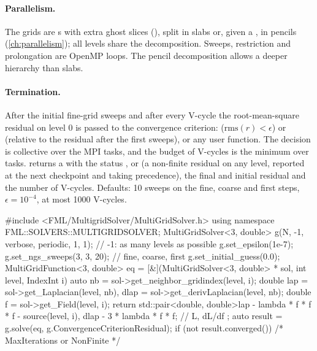 \paragraph*{Parallelism.} The grids are s with extra ghost slices (), split in
slabs or, given a , in pencils (\cref{ch:parallelism}); all levels share the decomposition. Sweeps,
restriction and prolongation are OpenMP loops. The pencil decomposition allows a deeper hierarchy than slabs.

\paragraph*{Termination.} After the initial fine-grid sweeps and after every V-cycle the root-mean-square residual on level 0
is passed to the convergence criterion:  ($\mathrm{rms}(r)<\epsilon$) or
 (relative to the residual after the first sweeps), or any user function. The decision is
collective over the MPI tasks, and the budget of V-cycles is the minimum over tasks.  returns a 
with the status ,  or  (a non-finite residual on any level, reported at
the next checkpoint and taking precedence), the final and initial residual and the number of V-cycles. Defaults: 10 sweeps
on the fine, coarse and first steps, $\epsilon=10^{-4}$, at most 1000 V-cycles.

\begin{cppcode}
#include <FML/MultigridSolver/MultiGridSolver.h>
using namespace FML::SOLVERS::MULTIGRIDSOLVER;
MultiGridSolver<3, double> g(N, -1, verbose, periodic, 1, 1);   // -1: as many levels as possible
g.set_epsilon(1e-7);
g.set_ngs_sweeps(3, 3, 20);                                     // fine, coarse, first
g.set_initial_guess(0.0);
MultiGridFunction<3, double> eq = [&](MultiGridSolver<3, double> * sol, int level, IndexInt i) {
    auto nb = sol->get_neighbor_gridindex(level, i);
    double lap  = sol->get_Laplacian(level, nb), dlap = sol->get_derivLaplacian(level, nb);
    double f    = sol->get_Field(level, i);
    return std::pair<double, double>{lap - lambda * f * f * f - source(level, i),
                                     dlap - 3 * lambda * f * f};        // {L, dL/df}
};
auto result = g.solve(eq, g.ConvergenceCriterionResidual);
if (not result.converged()) { /* MaxIterations or NonFinite */ }
\end{cppcode}

